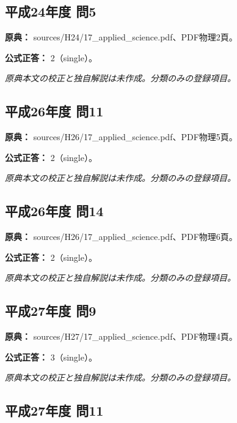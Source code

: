 \subsection{平成24年度 問5}
\label{q:h24-reg-applied-05}

\noindent\textbf{原典：} sources/H24/17\_applied\_science.pdf、PDF物理2頁。

\textbf{公式正答：} 2（single）。

\par\textit{原典本文の校正と独自解説は未作成。分類のみの登録項目。}

\subsection{平成26年度 問11}
\label{q:h26-reg-applied-11}

\noindent\textbf{原典：} sources/H26/17\_applied\_science.pdf、PDF物理5頁。

\textbf{公式正答：} 2（single）。

\par\textit{原典本文の校正と独自解説は未作成。分類のみの登録項目。}

\subsection{平成26年度 問14}
\label{q:h26-reg-applied-14}

\noindent\textbf{原典：} sources/H26/17\_applied\_science.pdf、PDF物理6頁。

\textbf{公式正答：} 2（single）。

\par\textit{原典本文の校正と独自解説は未作成。分類のみの登録項目。}

\subsection{平成27年度 問9}
\label{q:h27-reg-applied-09}

\noindent\textbf{原典：} sources/H27/17\_applied\_science.pdf、PDF物理4頁。

\textbf{公式正答：} 3（single）。

\par\textit{原典本文の校正と独自解説は未作成。分類のみの登録項目。}

\subsection{平成27年度 問11}
\label{q:h27-reg-applied-11}

